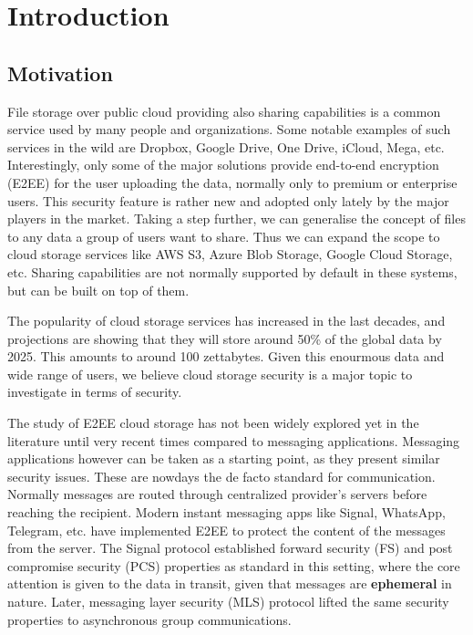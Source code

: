 \chapter{Introduction}


\section{Motivation}

File storage over public cloud providing also sharing capabilities is a common service used by many people and organizations.
Some notable examples of such services in the wild are Dropbox, Google Drive, One Drive, iCloud, Mega, etc.
Interestingly, only some of the major solutions provide end-to-end encryption (E2EE) for the user uploading 
the data, normally only to premium or enterprise users.\cite{Dropbox}\cite{googleWorkspaceE2EE}\cite{Apple}\cite{Mega}
This security feature is rather new and adopted only lately by the major players in the market.
Taking a step further, we can generalise the concept of files to any data a group of users want to share.
Thus we can expand the scope to cloud storage services like AWS S3, Azure Blob Storage, Google Cloud Storage, etc.
Sharing capabilities are not normally supported by default in these systems, but can be built on top of them.

The popularity of cloud storage services has increased in the last decades,
and projections are showing that they will store around 50\% of the global data by 2025.
This amounts to around 100 zettabytes.\cite{SteveMorgan}
Given this enourmous data and wide range of users, we believe cloud storage security is a major topic to investigate in terms of security.

The study of E2EE cloud storage has not been widely explored yet in the literature until very recent times compared to messaging applications.\cite{EPRINT:BDGHP24}
Messaging applications however can be taken as a starting point, as they present similar security issues.
These are nowdays the de facto standard for communication.
Normally messages are routed through centralized provider's servers before reaching the recipient.
Modern instant messaging apps like Signal, WhatsApp, Telegram, etc. 
have implemented E2EE to protect the content of the messages from the server.
The Signal protocol established forward security (FS) and post compromise security (PCS)
properties as standard in this setting, where the core attention is given to the data in transit,
given that messages are \textbf{ephemeral} in nature. 
Later, messaging layer security (MLS) protocol lifted the same security properties to asynchronous
group communications.

